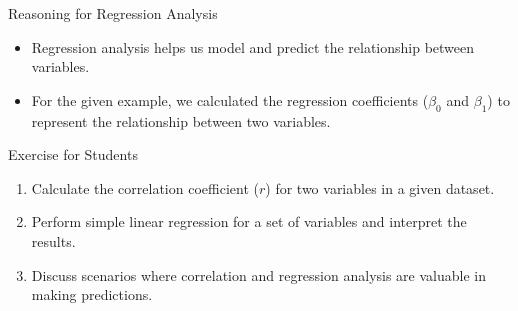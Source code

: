 \begin{frame}{Reasoning for Regression Analysis}
  \begin{itemize}
    \item Regression analysis helps us model and predict the relationship between variables.
    \item For the given example, we calculated the regression coefficients (\(\beta_0\) and \(\beta_1\)) to represent the relationship between two variables.
  \end{itemize}
\end{frame}

\begin{frame}{Exercise for Students}
  \begin{enumerate}
    \item Calculate the correlation coefficient (\(r\)) for two variables in a given dataset.
    \item Perform simple linear regression for a set of variables and interpret the results.
    \item Discuss scenarios where correlation and regression analysis are valuable in making predictions.
  \end{enumerate}
\end{frame}
